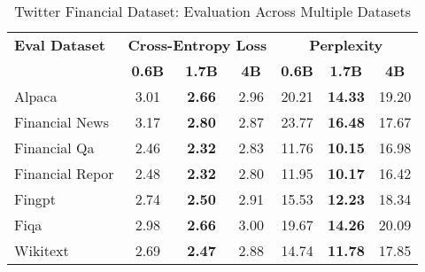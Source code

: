 
\begin{table}[h]
\centering
\caption[Twitter Financial: Evaluation Results]{Twitter Financial Dataset: Evaluation Across Multiple Datasets}
\label{tab:twitter_results}
\begin{tabular}{l|ccc|ccc}
\hline
\textbf{Eval Dataset} & \multicolumn{3}{c|}{\textbf{Cross-Entropy Loss}} & \multicolumn{3}{c}{\textbf{Perplexity}} \\
\cline{2-4} \cline{5-7}
  & \textbf{0.6B} & \textbf{1.7B} & \textbf{4B} & \textbf{0.6B} & \textbf{1.7B} & \textbf{4B} \\
Alpaca & 3.01 & \textbf{2.66} & 2.96 & 20.21 & \textbf{14.33} & 19.20 \\
Financial News & 3.17 & \textbf{2.80} & 2.87 & 23.77 & \textbf{16.48} & 17.67 \\
Financial Qa & 2.46 & \textbf{2.32} & 2.83 & 11.76 & \textbf{10.15} & 16.98 \\
Financial Repor & 2.48 & \textbf{2.32} & 2.80 & 11.95 & \textbf{10.17} & 16.42 \\
Fingpt & 2.74 & \textbf{2.50} & 2.91 & 15.53 & \textbf{12.23} & 18.34 \\
Fiqa & 2.98 & \textbf{2.66} & 3.00 & 19.67 & \textbf{14.26} & 20.09 \\
Wikitext & 2.69 & \textbf{2.47} & 2.88 & 14.74 & \textbf{11.78} & 17.85 \\
\hline
\end{tabular}
\end{table}

